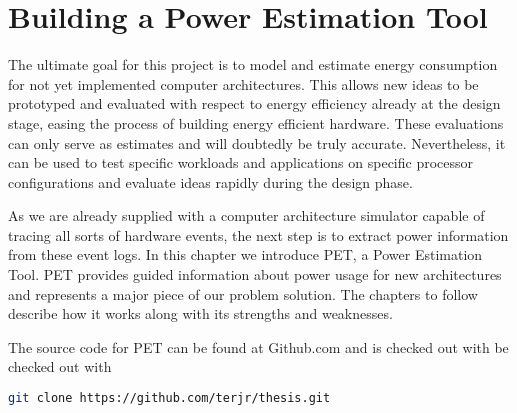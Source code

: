 \chapter{Building a Power Estimation Tool}

The ultimate goal for this project is to model and estimate energy consumption
for not yet implemented computer architectures. This allows new ideas to be
prototyped and evaluated with respect to energy efficiency already at the
design stage, easing the process of building energy efficient hardware. These
evaluations can only serve as estimates and will doubtedly be truly accurate.
Nevertheless, it can be used to test specific workloads and applications on
specific processor configurations and evaluate ideas rapidly during the design
phase.

As we are already supplied with a computer architecture simulator capable of
tracing all sorts of hardware events, the next step is to extract power
information from these event logs. In this chapter we introduce PET, a Power
Estimation Tool. PET provides guided information about power usage for new
architectures and represents a major piece of our problem solution. The chapters
to follow describe how it works along with its strengths and weaknesses.

\noindent The source code for PET can be found at Github.com and is checked out
with be checked out with
\begin{lstlisting}[language=bash,numbers=none]
git clone https://github.com/terjr/thesis.git
\end{lstlisting}






